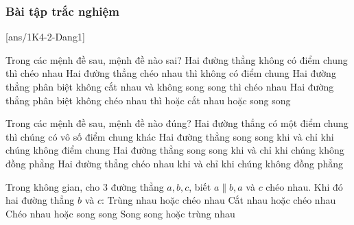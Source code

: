\subsubsection{Bài tập trắc nghiệm}
[ans/1K4-2-Dang1]
\begin{ex}%
Trong các mệnh đề sau, mệnh đề nào sai?
\choice
{\True Hai đường thẳng không có điểm chung thì chéo nhau}
{Hai đường thẳng chéo nhau thì không có điểm chung}
{Hai đường thẳng phân biệt không cắt nhau và không song song thì chéo nhau}
{Hai đường thẳng phân biệt không chéo nhau thì hoặc cắt nhau hoặc song song}
\end{ex}
\begin{ex}%
Trong các mệnh đề sau, mệnh đề nào đúng?
\choice
{Hai đường thẳng có một điểm chung thì chúng có vô số điểm chung khác}
{Hai đường thẳng song song khi và chỉ khi chúng không điểm chung}
{Hai đường thẳng song song khi và chỉ khi chúng không đồng phẳng}
{\True Hai đường thẳng chéo nhau khi và chỉ khi chúng không đồng phẳng}
\end{ex}
\begin{ex}%
Trong không gian, cho 3 đường thẳng $a, b, c$, biết $a \parallel b, a$ và $c$ chéo nhau. Khi đó hai đường thẳng $b$ và $c$:
\choice
{Trùng nhau hoặc chéo nhau}
{\True Cắt nhau hoặc chéo nhau}
{Chéo nhau hoặc song song}
{Song song hoặc trùng nhau}
\end{ex}
